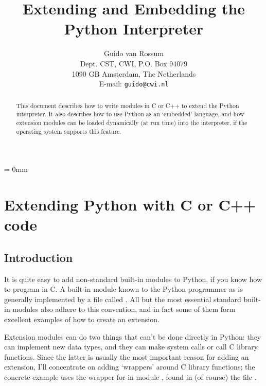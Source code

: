 
\title{\bf Extending and Embedding the Python Interpreter}

\author{
	Guido van Rossum \\
	Dept. CST, CWI, P.O. Box 94079 \\
	1090 GB Amsterdam, The Netherlands \\
	E-mail: {\tt guido@cwi.nl}
}

\makeindex




\maketitle

\begin{abstract}

\noindent
This document describes how to write modules in C or C++ to extend the
Python interpreter.  It also describes how to use Python as an
`embedded' language, and how extension modules can be loaded
dynamically (at run time) into the interpreter, if the operating
system supports this feature.

\end{abstract}

\pagebreak

{
\parskip = 0mm
\tableofcontents
}

\pagebreak



\chapter{Extending Python with C or C++ code}


\section{Introduction}

It is quite easy to add non-standard built-in modules to Python, if
you know how to program in C.  A built-in module known to the Python
programmer as  is generally implemented by a file called
.  All but the most essential standard built-in
modules also adhere to this convention, and in fact some of them form
excellent examples of how to create an extension.

Extension modules can do two things that can't be done directly in
Python: they can implement new data types, and they can make system
calls or call C library functions.  Since the latter is usually the
most important reason for adding an extension, I'll concentrate on
adding `wrappers' around C library functions; the concrete example
uses the wrapper for
 in module , found in (of course) the file
.

